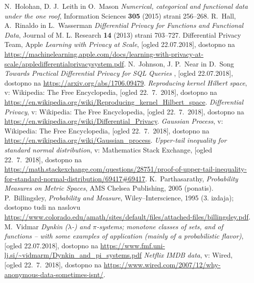 \documentclass[12pt,a4paper]{amsart}
\theoremstyle{definition} %
\theoremstyle{plain} %
\begin{document}
\begin{thebibliography}{99}

N.~Holohan, D. J.~Leith in O.~Mason \emph{Numerical, categorical and functional data under the one roof}, Information Sciences \textbf{305} (2015) strani 256--268.
R.~Hall, A.~Rinaldo in L.~Wasserman \emph{Differential Privacy for Functions and Functional Data}, Journal of M. L. Research \textbf{14} (2013) strani 703--727.
Differential Privacy Team, Apple \emph{Learning with Privacy at Scale}, [ogled 22.07.2018], dostopno na \url{https://machinelearning.apple.com/docs/learning-with-privacy-at-scale/appledifferentialprivacysystem.pdf}.
N.~Johnson, J. P.~Near in D.~Song \emph{Towards Practical Differential Privacy for SQL Queries
}, [ogled 22.07.2018], dostopno na \url{https://arxiv.org/abs/1706.09479}.
\emph{Reproducing kernel Hilbert space}, v: Wikipedia: The Free Encyclopedia, [ogled 22.~7.~2018], dostopno na \url{https://en.wikipedia.org/wiki/Reproducing_kernel_Hilbert_space}.
\emph{Differential Privacy}, v: Wikipedia: The Free Encyclopedia, [ogled 22.~7.~2018], dostopno na \url{https://en.wikipedia.org/wiki/Differential_Privacy}.
\emph{Gaussian Process}, v: Wikipedia: The Free Encyclopedia, [ogled 22.~7.~2018], dostopno na \url{https://en.wikipedia.org/wiki/Gaussian_process}.
\emph{Upper-tail inequality for standard normal distribution}, v: Mathematics Stack Exchange, [ogled 22.~7.~2018], dostopno na \url{https://math.stackexchange.com/questions/28751/proof-of-upper-tail-inequality-for-standard-normal-distribution/69417#69417}.
K.~Parthasarathy, \emph{Probability Measures on Metric Spaces}, AMS Chelsea Publishing, 2005 (ponatis).
P.~Billingsley, \emph{Probability and Measure}, Wiley--Interscience, 1995 (3. izdaja); dostopno tudi na naslovu \url{https://www.colorado.edu/amath/sites/default/files/attached-files/billingsley.pdf}.
M.~Vidmar \emph{Dynkin ($\lambda$-) and $\pi$-systems; monotone classes of sets, and of
functions – with some examples of application (mainly of a
probabilistic flavor)}, [ogled 22.07.2018], dostopno na \url{https://www.fmf.uni-lj.si/~vidmarm/Dynkin_and_pi_systems.pdf} 
\emph{Netflix IMDB data}, v: Wired, [ogled 22.~7.~2018], dostopno na \url{https://www.wired.com/2007/12/why-anonymous-data-sometimes-isnt/}.




\end{thebibliography}
\end{document}
